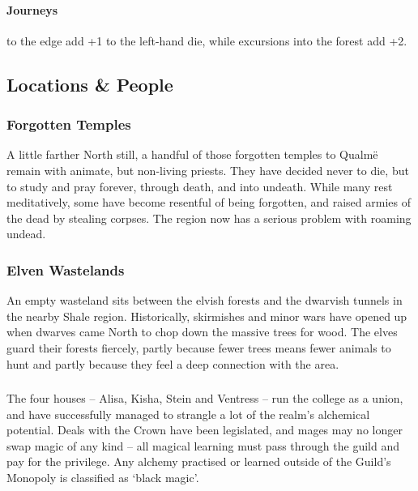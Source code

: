 \begin{multicols}{2}
{  \paragraph{Journeys}
  to the \gls{edge} add +1 to the left-hand die, while excursions into the forest add +2.

\subsection{Locations \& People}

}

\subsubsection{Forgotten Temples}

A little farther North still, a handful of those forgotten temples to Qualm\"{e} remain with animate, but non-living priests.
They have decided never to die, but to study and pray forever, through death, and into undeath.
While many rest meditatively, some have become resentful of being forgotten, and raised armies of the dead by stealing corpses.
The region now has a serious problem with roaming undead.

\subsubsection{Elven Wastelands}

An empty wasteland sits between the elvish forests and the dwarvish tunnels in the nearby Shale region.
Historically, skirmishes and minor wars have opened up when dwarves came North to chop down the massive trees for wood.
The elves guard their forests fiercely, partly because fewer trees means fewer animals to hunt and partly because they feel a deep connection with the area.

\subsubsection{}

The four houses -- Alisa, Kisha, Stein and Ventress -- run the college as a union, and have successfully managed to strangle a lot of the realm's alchemical potential.
Deals with the Crown have been legislated, and mages may no longer swap magic of any kind -- all magical learning must pass through the guild and pay for the privilege.
Any alchemy practised or learned outside of the Guild's Monopoly is classified as `black magic'.


\end{multicols}

